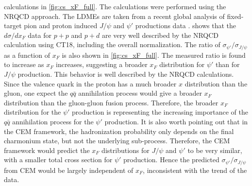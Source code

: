 \documentclass[../main.tex]{subfiles}
\begin{document}
calculations in \cref{fig:cs_xF_full}. The calculations were performed using the NRQCD approach.
The LDMEs are taken from a recent global analysis of fixed-target pion and proton induced $J/\psi$
and $\psi'$ productions data \cite{hsieh2021,chang2023}.
 shows that the $d\sigma/dx_F$ data for $p+p$ and $p+d$ are very well described
by the NRQCD calculation using CT18, including the overall normalization.
The ratio of $\sigma_{\psi'}/\sigma_{J/\psi}$ as a function of $x_F$
is also shown in \cref{fig:cs_xF_full}. The measured ratio is found to increase as $x_F$ increases,
suggesting a broader $x_F$ distribution for $\psi'$ than for $J/\psi$ production. 
This behavior is well described by the NRQCD calculations.
Since the valence quark in the proton has a much broader $x$ distribution than the gluon,
one expect the $q\bar{q}$ annihilation process would give a broader $x_F$ distribution than the
gluon-gluon fusion process. Therefore, the broader $x_F$ distribution for the $\psi'$ production
is representing the increasing importance of the $q\bar{q}$ annihilation process for the $\psi'$
production.
It is also worth pointing out that in the CEM framework, the hadronization probability only depends on
the final charmonium state, but not the underlying sub-process. Therefore, the CEM framework would predict
the $x_F$ distributions for $J/\psi$ and $\psi'$ to be very similar, with a smaller total cross section
for $\psi'$ production. Hence the predicted $\sigma_{\psi'}/\sigma_{J/\psi}$ from CEM would be
largely independent of $x_F$, inconsistent with the trend of the data.
\end{document}
